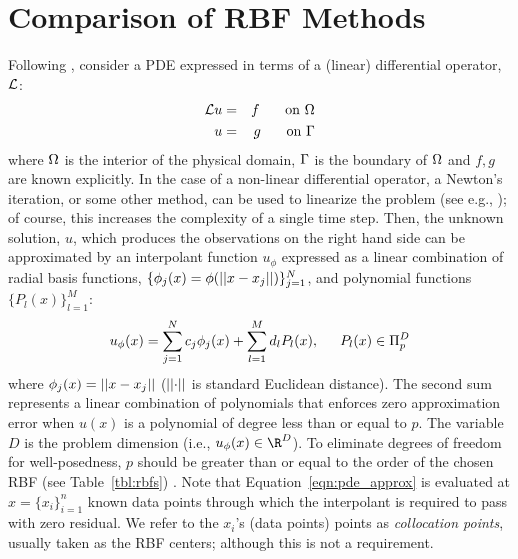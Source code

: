 \documentclass{report}
\begin{document}
{\section{Comparison of RBF Methods}
Following \cite{Mouat2002}, consider a PDE expressed in terms of a (linear) differential operator, $\diffop$: 
\begin{eqnarray}
\mathcal{L}u & = & f \hskip1.5em \textrm{ on } \Omega \\
u &=& g \hskip1.5em \textrm{ on } \Gamma
\end{eqnarray}
where $\Omega$ is the interior of the physical domain, $\Gamma$ is the boundary of $\Omega$ and $f,g$ are known explicitly. In the case of a non-linear differential operator, a Newton's iteration, or some other method, can be used to linearize the problem (see e.g., \cite{WrightFornberg06}); of course, this increases the complexity of a single time step. Then, the unknown solution, $u$, which produces the observations on the right hand side can be approximated by an interpolant function $u_{\phi}$ expressed as a linear combination of radial basis functions, $\{\phi_j(x) = \phi(\left|\left|x-x_j\right|\right|)\}_{j=1}^{N}$, and polynomial functions$\{P_l(x)\}_{l=1}^{M}$:
\begin{equation}
	u_{\phi}(x) = \sum_{j=1}^{N} c_{j}  \phi_j(x) + \sum_{l=1}^{M} d_{l} P_l(x), \hskip1.5em P_l(x) \in \Pi^{D}_{p}
	\label{eqn:pde_approx}
\end{equation}
where $\phi_j(x) = \left|\left|x - x_j\right|\right|$ ($\left|\left|\cdot\right|\right|$ is standard Euclidean distance). The 
second sum represents a linear combination of polynomials that enforces zero approximation error
 when $u(x)$ is a polynomial of degree less than or equal to $p$. The variable $D$ is the 
 problem dimension (i.e., $u_{\phi}(x) \in \R^{D}$). 
To eliminate degrees of freedom for well-posedness, $p$ should be greater than or equal to the order of the chosen RBF
 (see Table~\ref{tbl:rbfs}) \cite{Iske2004}.  
Note that Equation~\ref{eqn:pde_approx} is evaluated 
 at $x = \{x_i\}_{i=1}^{n}$ known 
data points through which the interpolant is required to pass with zero residual.  We refer to 
the $x_i$'s (data points) points as \emph{collocation points}, usually taken as the RBF centers; although this is not a requirement.

}
\end{document}
